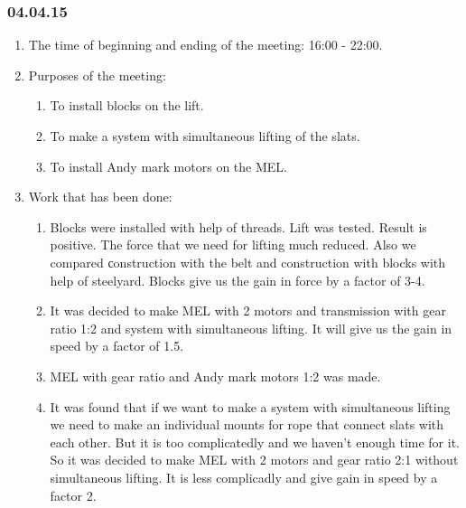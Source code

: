 \subsubsection{04.04.15}
\begin{enumerate}
	
	\item The time of beginning and ending of the meeting: 16:00 - 22:00.
	
	\item Purposes of the meeting: 
	\begin{enumerate}
		
		\item To install blocks on the lift.
		
		\item To make a system with simultaneous lifting of the slats.
		
        \item To install Andy mark motors on the MEL.
		
	\end{enumerate}

	\item Work that has been done:
	\begin{enumerate}
		
		\item Blocks were installed with help of threads. Lift was tested. Result is positive. The force that we need for lifting much reduced. Also we compared сonstruction with the belt and construction with blocks with help of steelyard. Blocks give us the gain in force by a factor of 3-4.   
		
		\item It was decided to make MEL with 2 motors and transmission with gear ratio 1:2 and system with simultaneous lifting. It will give us the gain in speed by a factor of 1.5.
		
		\item MEL with gear ratio and Andy mark motors 1:2 was made.
		
        \item It was found that if we want to make a system with simultaneous lifting we need to make an individual mounts for rope that connect slats with each other. But it is too complicatedly and we haven't enough time for it. So it was decided to make MEL with 2 motors and gear ratio 2:1 without simultaneous lifting. It is less complicadly and give gain in speed by a factor 2. 

	\end{enumerate}
	

\end{enumerate}
